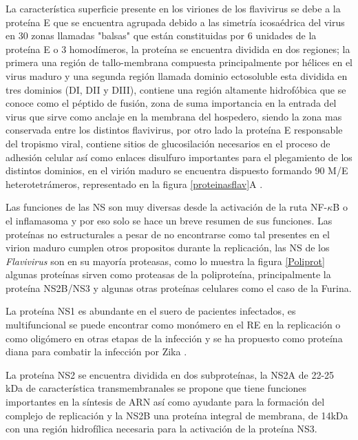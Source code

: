 La característica superficie presente en los viriones de los flavivirus se debe a la proteína \ac{E} que se encuentra agrupada debido a las simetría icosaédrica del virus en 30 zonas llamadas "balsas" que están constituidas por 6 unidades de la proteína \ac{E} o 3 homodímeros, la proteína se encuentra dividida en dos regiones; la primera una región de tallo-membrana compuesta principalmente por hélices en el virus maduro y una segunda región llamada dominio ectosoluble esta dividida en tres dominios (DI, DII y DIII), contiene una región altamente hidrofóbica que se conoce como el péptido de fusión, zona de suma importancia en la entrada del virus que sirve como anclaje en la membrana del hospedero, siendo la zona mas conservada entre los distintos flavivirus, por otro lado la proteína \ac{E} responsable del tropismo viral, contiene sitios de glucosilación necesarios en el proceso de adhesión celular así como enlaces disulfuro importantes para el plegamiento de los distintos dominios, en el virión maduro se encuentra dispuesto formando 90 \ac{M}/\ac{E} heterotetrámeros, representado en la figura \ref{proteinasflav}A .\cite{Barrows2018,VanLeur2021,Seligman2008, Marzinek2015, Majowicz2023}

Las funciones de las \ac{NS} son muy diversas desde la activación de la ruta NF-$\kappa$B o el inflamasoma y por eso solo se hace un breve resumen de sus funciones. Las proteínas no estructurales  a pesar de no encontrarse como tal presentes en el virion maduro cumplen otros propositos durante la replicación, las \ac{NS} de los \textit{Flavivirus} son en su mayoría proteasas, como lo muestra la figura \ref{Poliprot} algunas proteínas sirven como proteasas de la poliproteína, principalmente la proteína \ac{NS}2B/\ac{NS}3 y algunas otras proteínas celulares como el caso de la Furina. 

La proteína \ac{NS}1 es abundante en el suero de pacientes infectados, es multifuncional se puede encontrar como monómero en el \ac{RE} en la replicación o como oligómero en otras etapas de la infección y se ha propuesto como proteína diana para combatir la infección por Zika .\cite{VanLeur2021,Latanova2022,Raza2020, Rastogi2016}
  
La proteína \ac{NS}2 se encuentra dividida en dos subproteínas, la \ac{NS}2A de 22-25 kDa de característica transmembranales se propone que tiene funciones importantes en la síntesis de \ac{ARN} así como ayudante para la formación del complejo de replicación y la \ac{NS}2B una proteína integral de membrana, de 14kDa con una región hidrofílica necesaria para la activación de la proteína \ac{NS}3.


